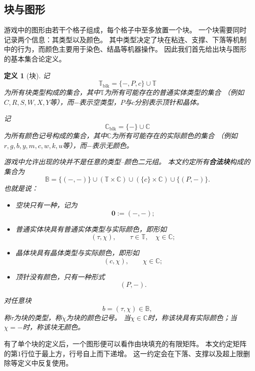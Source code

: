 \documentclass[UTF8,fontset=none]{ctexart}
\theoremstyle{cnthm}
\newtheorem{definition}{定义}[section]
\begin{document}
		\subsection{块与图形}
			
			游戏中的图形由若干个格子组成，每个格子中至多放置一个块。
			一个块需要同时记录两个信息：其类型以及颜色。
			其中类型决定了块在粘连、支撑、下落等机制中的行为，而颜色主要用于染色、结晶等机器操作。
			因此我们首先给出块与图形的基本集合论定义。
			
			\begin{definition}[块]
				记
				$$
				\mathbb{T}_{\mathrm{blk}}
				=
				\{-,P,c\}\cup \mathbb{T}
				$$
				为所有块类型构成的集合，其中$\mathbb{T}$为所有可能存在的普通实体类型的集合
				（例如$C,R,S,W,X,Y$等），而$-$表示空类型，$P$与$c$分别表示顶针和晶体。
				
				记
				$$
				\mathbb{C}_{\mathrm{blk}}
				=
				\{-\}\cup \mathbb{C}
				$$
				为所有颜色记号构成的集合，其中$\mathbb{C}$为所有可能存在的实际颜色的集合
				（例如$r,g,b,y,m,c,w,k,u$等），而$-$表示无颜色。
				
				游戏中允许出现的块并不是任意的类型--颜色二元组。
				本文约定所有\textbf{合法块}构成的集合为
				$$
				\mathbb{B}
				=
				\{(-,-)\}
				\cup
				(\mathbb{T}\times\mathbb{C})
				\cup
				(\{c\}\times\mathbb{C})
				\cup
				\{(P,-)\}.
				$$
				也就是说：
				\begin{itemize}
					\item 空块只有一种，记为
					$$
					\mathbf{0}:=(-,-);
					$$
					\item 普通实体块具有普通实体类型与实际颜色，即形如
					$$
					(\tau,\chi),
					\qquad
					\tau\in\mathbb{T},\quad \chi\in\mathbb{C};
					$$
					\item 晶体块具有晶体类型与实际颜色，即形如
					$$
					(c,\chi),
					\qquad
					\chi\in\mathbb{C};
					$$
					\item 顶针没有颜色，只有一种形式
					$$
					(P,-).
					$$
				\end{itemize}
				
				对任意块
				$$
				b=(\tau,\chi)\in\mathbb{B},
				$$
				称$\tau$为块的类型，称$\chi$为块的颜色记号。
				当$\chi\in\mathbb{C}$时，称该块具有实际颜色；当$\chi=-$时，称该块无颜色。
			\end{definition}
			
			有了单个块的定义后，一个图形便可以看作由块填充的有限矩阵。
			本文约定矩阵的第$1$行位于最上方，行号自上而下递增。
			这一约定会在下落、支撑以及超上限删除等定义中反复使用。
			
\end{document}
